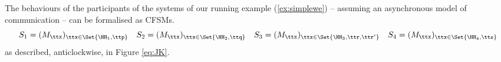 \begin{example}
{%
%
% 
%
%
%


The behaviours of the participants of the systems 
of 
our running example (\cref{ex:simplewe})
-- assuming an asynchronous model of communication -- can be formalised as CFSMs.
$$
S_1=(M_{\ttx})_{\ttx\in\Set{\HH_1,\ttp}} \quad S_2=(M_{\ttx})_{\ttx\in\Set{\HH_2,\ttq}}\quad S_3=(M_{\ttx})_{\ttx\in\Set{\HH_3,\ttr,\ttr'}} \quad S_4=(M_{\ttx})_{\ttx\in\Set{\HH_4,\tts}}
$$
as described, anticlockwise, in Figure \ref{eq:JK}.
}
 \finex
\end{example}

